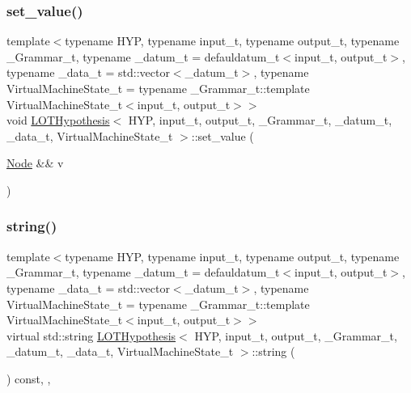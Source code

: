 \mbox{\label{class_l_o_t_hypothesis_a51a0d09f0f15a185d2b9a7efce48fc98}} 
\subsubsection{\texorpdfstring{set\+\_\+value()}{set\_value()}\hspace{0.1cm}{\footnotesize\ttfamily [2/2]}}
{\footnotesize\ttfamily template$<$typename H\+YP, typename input\+\_\+t, typename output\+\_\+t, typename \+\_\+\+Grammar\+\_\+t, typename \+\_\+datum\+\_\+t = defauldatum\+\_\+t$<$input\+\_\+t, output\+\_\+t$>$, typename \+\_\+data\+\_\+t = std\+::vector$<$\+\_\+datum\+\_\+t$>$, typename Virtual\+Machine\+State\+\_\+t = typename \+\_\+\+Grammar\+\_\+t\+::template Virtual\+Machine\+State\+\_\+t$<$input\+\_\+t, output\+\_\+t$>$$>$ \\
void \hyperlink{class_l_o_t_hypothesis}{L\+O\+T\+Hypothesis}$<$ H\+YP, input\+\_\+t, output\+\_\+t, \+\_\+\+Grammar\+\_\+t, \+\_\+datum\+\_\+t, \+\_\+data\+\_\+t, Virtual\+Machine\+State\+\_\+t $>$\+::set\+\_\+value (\begin{DoxyParamCaption}\item[{\hyperlink{class_node}{Node} \&\&}]{v }\end{DoxyParamCaption})\hspace{0.3cm}{\ttfamily [inline]}}

\mbox{\label{class_l_o_t_hypothesis_acda322aef217a0d358ae6cea19969904}} 
\subsubsection{\texorpdfstring{string()}{string()}}
{\footnotesize\ttfamily template$<$typename H\+YP, typename input\+\_\+t, typename output\+\_\+t, typename \+\_\+\+Grammar\+\_\+t, typename \+\_\+datum\+\_\+t = defauldatum\+\_\+t$<$input\+\_\+t, output\+\_\+t$>$, typename \+\_\+data\+\_\+t = std\+::vector$<$\+\_\+datum\+\_\+t$>$, typename Virtual\+Machine\+State\+\_\+t = typename \+\_\+\+Grammar\+\_\+t\+::template Virtual\+Machine\+State\+\_\+t$<$input\+\_\+t, output\+\_\+t$>$$>$ \\
virtual std\+::string \hyperlink{class_l_o_t_hypothesis}{L\+O\+T\+Hypothesis}$<$ H\+YP, input\+\_\+t, output\+\_\+t, \+\_\+\+Grammar\+\_\+t, \+\_\+datum\+\_\+t, \+\_\+data\+\_\+t, Virtual\+Machine\+State\+\_\+t $>$\+::string (\begin{DoxyParamCaption}{ }\end{DoxyParamCaption}) const\hspace{0.3cm}{\ttfamily [inline]}, {\ttfamily [override]}, {\ttfamily [virtual]}}



